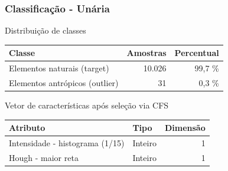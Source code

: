 \documentclass[t]{beamer}
\begin{document}
\begin{frame}[c]
	\frametitle{Classificação - Unária}
	
	\centering
	Distribuição de classes

	\small{
		\begin{table}[h]
		\centering
		\begin{tabulary}{\linewidth}{|L|R|R|}
		\hline
		\textbf{Classe} & \textbf{Amostras} & \textbf{Percentual} \\ \hline
		Elementos naturais (target)    & 10.026 & 99,7 \% \\ \hline
		Elementos antrópicos (outlier) &     31 &  0,3 \% \\ \hline
		\end{tabulary}
	\end{table}
	}

	\centering
	Vetor de características após seleção via CFS

	\small{
		\begin{table}[h]
		\centering
		\begin{tabulary}{\linewidth}{|L|L|R|}
		\hline
		\textbf{Atributo} & \textbf{Tipo} & \textbf{Dimensão} \\ \hline
		Intensidade - histograma (1/15) & Inteiro & 1 \\ \hline
		Hough - maior reta              & Inteiro & 1 \\ \hline
		\end{tabulary}
		\end{table}
	}
	
\end{frame}
\end{document}
